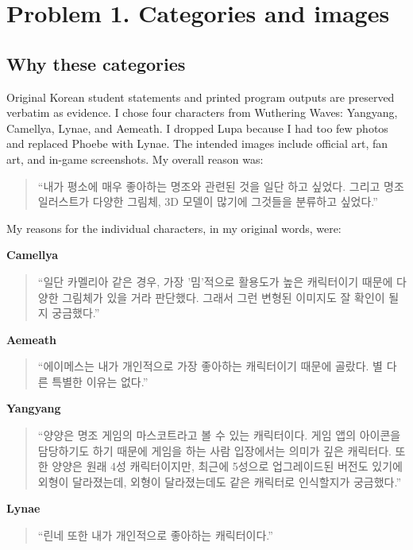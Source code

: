 \documentclass[11pt]{article}
\begin{document}
\makeheader

\section*{Problem 1. Categories and images}
\subsection*{Why these categories}
Original Korean student statements and printed program outputs are preserved verbatim as evidence. I chose four characters from Wuthering Waves: Yangyang, Camellya, Lynae, and Aemeath. I dropped Lupa because I had too few photos and replaced Phoebe with Lynae. The intended images include official art, fan art, and in-game screenshots. My overall reason was:
\begin{quote}
``내가 평소에 매우 좋아하는 명조와 관련된 것을 일단 하고 싶었다. 그리고 명조 일러스트가 다양한 그림체, 3D 모델이 많기에 그것들을 분류하고 싶었다.''
\end{quote}

My reasons for the individual characters, in my original words, were:
\par\noindent\begin{minipage}{\linewidth}
\textbf{Camellya}
\begin{quote}
``일단 카멜리아 같은 경우, 가장 '밈'적으로 활용도가 높은 캐릭터이기 때문에 다양한 그림체가 있을 거라 판단했다. 그래서 그런 변형된 이미지도 잘 확인이 될 지 궁금했다.''
\end{quote}
\end{minipage}\par\medskip
\par\noindent\begin{minipage}{\linewidth}
\textbf{Aemeath}
\begin{quote}
``에이메스는 내가 개인적으로 가장 좋아하는 캐릭터이기 때문에 골랐다. 별 다른 특별한 이유는 없다.''
\end{quote}
\end{minipage}\par\medskip
\par\noindent\begin{minipage}{\linewidth}
\textbf{Yangyang}
\begin{quote}
``양양은 명조 게임의 마스코트라고 볼 수 있는 캐릭터이다. 게임 앱의 아이콘을 담당하기도 하기 때문에 게임을 하는 사람 입장에서는 의미가 깊은 캐릭터다. 또한 양양은 원래 4성 캐릭터이지만, 최근에 5성으로 업그레이드된 버전도 있기에 외형이 달라졌는데, 외형이 달라졌는데도 같은 캐릭터로 인식할지가 궁금했다.''
\end{quote}
\end{minipage}\par\medskip
\par\noindent\begin{minipage}{\linewidth}
\textbf{Lynae}
\begin{quote}
``린네 또한 내가 개인적으로 좋아하는 캐릭터이다.''
\end{quote}
\end{minipage}\par\medskip
\end{document}
